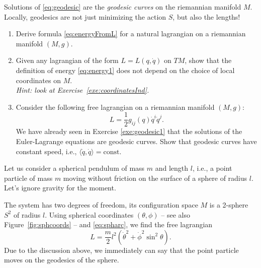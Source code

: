 \documentclass[english,fontsize=11pt,paper=a5,oneside]{scrbook}
\newcommand{\lag}{\langle}
\newcommand{\rag}{\rangle}
\let\d\relax
\newcommand{\d}{\mathrm{d}}
\theoremstyle{definition}
\newenvironment{example}
  {\pushQED{\qed}\renewcommand{\qedsymbol}{$\lozenge$}\examplex}
  {\popQED\endexamplex}
\newenvironment{exercise}
  {\pushQED{\qed}\renewcommand{\qedsymbol}{$\maltese$}\exercisex}
  {\popQED\endexercisex}
\begin{document}
Solutions of \eqref{eq:geodesic} are the \emph{geodesic curves} on the riemannian manifold $M$. Locally, geodesics are not just minimizing the action $S$, but also the lengths!

\begin{exercise}
  \begin{enumerate}
    \item Derive formula \eqref{eq:energyFromL} for a natural lagrangian on a riemannian manifold $(M,g)$.
    \item Given any lagrangian of the form $L = L(q, \dot q)$ on $TM$, show that the definition of energy \eqref{eq:energy1} does not depend on the choice of local coordinates on $M$.\\\textit{Hint: look at Exercise~\ref{exe:coordinatesInd}.}
    \item Consider the following free lagrangian on a riemannian manifold $(M, g)$:
          \begin{equation}
            L = \frac12 g_{ij}(q)\dot q^i \dot q^j.
          \end{equation}
          We have already seen in Exercise \ref{exe:geodesic1} that the solutions of the Euler-Lagrange equations are geodesic curves.
          Show that geodesic curves have constant speed, i.e., $\lag\dot q, \dot q\rag = \mathrm{const}$.
  \end{enumerate}
\end{exercise}

\begin{example}\label{ex:sphericalP}
  Let us consider a spherical pendulum of mass $m$ and length $l$, i.e., a point particle of mass $m$ moving without friction on the surface of a sphere of radius $l$.
  Let's ignore gravity for the moment.

  The system has two degrees of freedom, its configuration space $M$ is a 2-sphere $S^2$ of radius $l$.
  Using spherical coordinates $(\theta, \phi)$ -- see also Figure~\ref{fig:sphcoords} -- and \eqref{eq:spharc}, we find the free lagrangian
  \begin{equation}\label{eq:LsphericalP}
    L = \frac m2 l^2(\dot \theta^2 + \dot \phi^2 \sin^2\theta).
  \end{equation}
  Due to the discussion above, we immediately can say that the point particle moves on the geodesics of the sphere.
\end{example}
\end{document}
